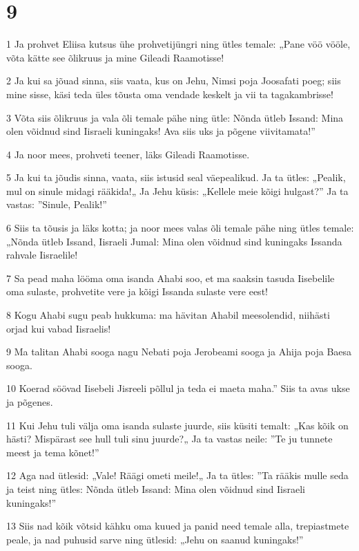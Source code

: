 \chapter{9}

\par 1 Ja prohvet Eliisa kutsus ühe prohvetijüngri ning ütles temale: „Pane vöö vööle, võta kätte see õlikruus ja mine Gileadi Raamotisse!
\par 2 Ja kui sa jõuad sinna, siis vaata, kus on Jehu, Nimsi poja Joosafati poeg; siis mine sisse, käsi teda üles tõusta oma vendade keskelt ja vii ta tagakambrisse!
\par 3 Võta siis õlikruus ja vala õli temale pähe ning ütle: Nõnda ütleb Issand: Mina olen võidnud sind Iisraeli kuningaks! Ava siis uks ja põgene viivitamata!”
\par 4 Ja noor mees, prohveti teener, läks Gileadi Raamotisse.
\par 5 Ja kui ta jõudis sinna, vaata, siis istusid seal väepealikud. Ja ta ütles: „Pealik, mul on sinule midagi rääkida!„ Ja Jehu küsis: „Kellele meie kõigi hulgast?” Ja ta vastas: ”Sinule, Pealik!”
\par 6 Siis ta tõusis ja läks kotta; ja noor mees valas õli temale pähe ning ütles temale: „Nõnda ütleb Issand, Iisraeli Jumal: Mina olen võidnud sind kuningaks Issanda rahvale Iisraelile!
\par 7 Sa pead maha lööma oma isanda Ahabi soo, et ma saaksin tasuda Iisebelile oma sulaste, prohvetite vere ja kõigi Issanda sulaste vere eest!
\par 8 Kogu Ahabi sugu peab hukkuma: ma hävitan Ahabil meesolendid, niihästi orjad kui vabad Iisraelis!
\par 9 Ma talitan Ahabi sooga nagu Nebati poja Jerobeami sooga ja Ahija poja Baesa sooga.
\par 10 Koerad söövad Iisebeli Jisreeli põllul ja teda ei maeta maha.” Siis ta avas ukse ja põgenes.
\par 11 Kui Jehu tuli välja oma isanda sulaste juurde, siis küsiti temalt: „Kas kõik on hästi? Mispärast see hull tuli sinu juurde?„ Ja ta vastas neile: ”Te ju tunnete meest ja tema kõnet!”
\par 12 Aga nad ütlesid: „Vale! Räägi ometi meile!„ Ja ta ütles: ”Ta rääkis mulle seda ja teist ning ütles: Nõnda ütleb Issand: Mina olen võidnud sind Iisraeli kuningaks!”
\par 13 Siis nad kõik võtsid kähku oma kuued ja panid need temale alla, trepiastmete peale, ja nad puhusid sarve ning ütlesid: „Jehu on saanud kuningaks!”
